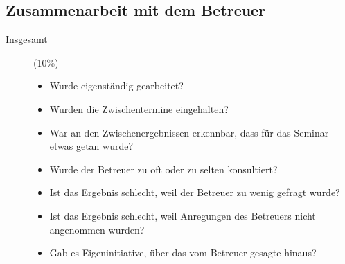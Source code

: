 \documentclass[final,bibliography=totocnumbered]{include/sikseminar}
\begin{document}
\subsection{Zusammenarbeit mit dem Betreuer}
\begin{description}
  \item[Insgesamt] (10\%)
    \begin{itemize}
      \item Wurde eigenständig gearbeitet?
	  \item Wurden die Zwischentermine eingehalten?
	  \item War an den Zwischenergebnissen erkennbar, dass für das Seminar etwas getan wurde?
      \item Wurde der Betreuer zu oft oder zu selten konsultiert?
      \item Ist das Ergebnis schlecht, weil der Betreuer zu wenig gefragt wurde?
      \item Ist das Ergebnis schlecht, weil Anregungen des Betreuers nicht angenommen wurden?
      \item Gab es Eigeninitiative, über das vom Betreuer gesagte hinaus?
    \end{itemize}
\end{description}






\printbibliography

\listoftodos
\end{document}
